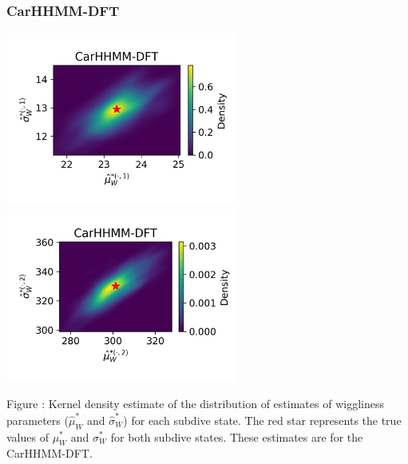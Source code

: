 \documentclass{article}
\begin{document}
        \subsubsection{CarHHMM-DFT}
        \begin{center}
        \includegraphics[width=3in]{../Plots/hhmm_FV_MLE_density_FoVeDBA_0_0.png}
        \includegraphics[width=3in]{../Plots/hhmm_FV_MLE_density_FoVeDBA_0_1.png}
        \end{center}
        
        \noindent Figure : Kernel density estimate of the distribution of estimates of wiggliness parameters ($\hat \mu^*_W$ and $\hat \sigma^*_W$) for each subdive state. The red star represents the true values of $\mu^*_W$ and $\sigma^*_W$ for both subdive states. These estimates are for the CarHHMM-DFT.
        \addtocounter{fignum}{1}
        
\end{document}
